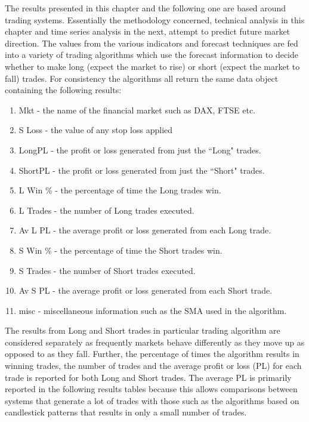 The results presented in this chapter and the following one are based around trading systems. Essentially the methodology concerned, technical analysis in this chapter and time series analysis in the next, attempt to predict future market direction. The values from the various indicators and forecast techniques are fed into a variety of trading algorithms which use the forecast information to decide whether to make long (expect the market to rise) or short (expect the market to fall) trades. For consistency the algorithms all return the same data object containing the following results:

\begin{enumerate}
\item Mkt - the name of the financial market such as DAX, FTSE etc.
\item S Loss - the value of any stop loss applied
\item LongPL - the profit or loss generated from just the \textquotedblleft Long" trades.
\item ShortPL - the profit or loss generated from just the \textquotedblleft Short" trades.
\item L Win \% - the percentage of time the Long trades win.
\item L Trades - the number of Long trades executed.
\item Av L PL - the average profit or loss generated from each Long trade.
\item S Win \% - the percentage of time the Short trades win.
\item S Trades - the number of Short trades executed.
\item Av S PL - the average profit or loss generated from each Short trade.
\item misc - miscellaneous information such as the SMA used in the algorithm.
\end{enumerate}

The results from Long and Short trades in particular trading algorithm are considered separately as frequently markets behave differently as they move up as opposed to as they fall. Further, the percentage of times the algorithm results in winning trades, the number of trades and the average profit or loss (PL) for each trade is reported for both Long and Short trades. The average PL is primarily reported in the following results tables because this allows comparisons between systems that generate a lot of trades with those such as the algorithms based on candlestick patterns that results in only a small number of trades. 

